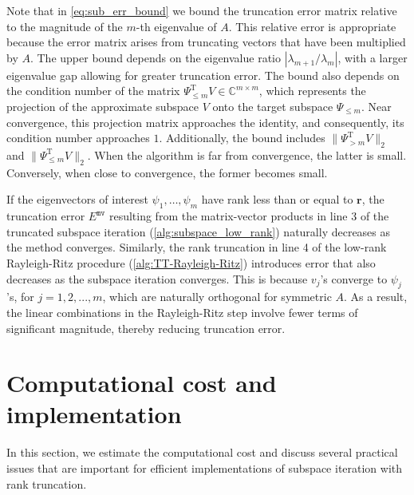 \documentclass[10pt,preprint]{elsarticle}
\renewcommand{\top}{\text{T}}
\def\vs{\vspace{0.2cm}}
\begin{document}
\vs
\noindent
Note that in \eqref{eq:sub_err_bound} we bound the truncation error matrix relative to the magnitude of the $m$-th eigenvalue of $A$. This relative error is appropriate because the error matrix arises from truncating vectors that have been multiplied by $A$. The upper bound depends on the eigenvalue ratio $|\lambda_{m+1} / \lambda_m|$, with a larger eigenvalue gap allowing for greater truncation error. 
%
The bound also depends on the condition number of the matrix $\Psi_{\leq m}^{\top} V \in \mathbb{C}^{m \times m}$, which represents the projection of the approximate subspace $V$ onto the target subspace $\Psi_{\leq m}$. Near convergence, this projection matrix approaches the identity, and consequently, its condition number approaches $1$. 
%
Additionally, the bound includes $\|\Psi_{>m}^{\top} V\|_2$ and $\|\Psi_{\leq m}^{\top} V\|_2$. When the algorithm is far from convergence, the latter is small. Conversely, when close to convergence, the former becomes small. 

If the eigenvectors of interest $\psi_1, \ldots, \psi_m$ have rank less than or equal to $\bm{r}$, the truncation error $E^{\texttt{mv}}$ resulting from the matrix-vector products in line 3 of the truncated subspace iteration (\cref{alg:subspace_low_rank}) naturally decreases as the method converges. Similarly, the rank truncation in line 4 of the low-rank Rayleigh-Ritz procedure (\cref{alg:TT-Rayleigh-Ritz}) introduces error that also decreases as the subspace iteration converges. This is because $v_j$'s converge to $\psi_j$'s, for $j=1,2,...,m$, which are naturally orthogonal for symmetric $A$. As a result, the linear combinations in the Rayleigh-Ritz step involve fewer terms of significant magnitude, thereby reducing truncation error. 

\section{Computational cost and implementation}
\label{sec:cost_and_imp}
In this section, we estimate the computational cost and discuss several practical issues that are important for efficient implementations of subspace iteration with rank truncation. 
%
\end{document}
